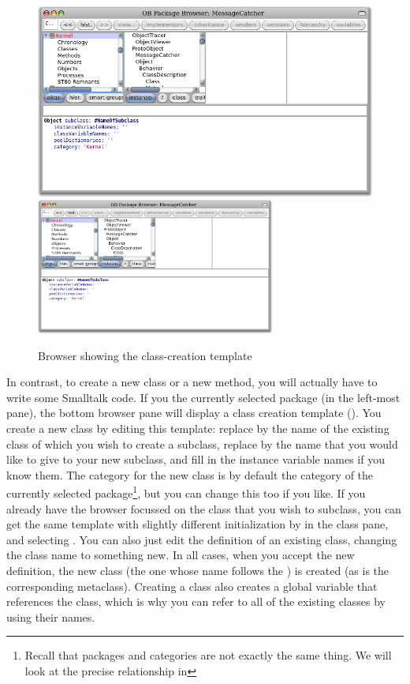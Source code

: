 \documentclass[a4paper,10pt,twoside]{book}
\begin{document}
\begin{figure}[htbp]
   \centering
   \ifluluelse
	   {\includegraphics[width=\textwidth]{SystemBrowserClassCreation}}
	   {\includegraphics[width=0.7\textwidth]{SystemBrowserClassCreation}}
   \caption{Browser showing the class-creation template
   }
\end{figure}

In contrast, to create a new class or a new method, you will actually
have to write some Smalltalk code.  If you \click the currently
selected package (in the left-most pane), the bottom
browser pane will display a class creation template
().  You create a new class by
editing this template: replace  by the name of the existing
class of which you wish to create a subclass, replace
 by the name that you would like to give to your
new subclass, and fill in the instance variable names if you know
them.  The category for the new class is by default the category of the currently
selected package\footnote{Recall that packages and categories are not exactly the same thing. We will look at the precise relationship in }, but you can change this too if you like.  If you
already have the browser focussed on the class that you wish to
subclass, you can get the same template with slightly different
initialization by  in the class pane, and
selecting .  You can also just
edit the definition of an existing class, changing the class name to
something new.  In all cases, when you accept the new definition, the
new class (the one whose name follows the \ct{#}) is created (as is
the corresponding metaclass).  Creating a class also creates a global
variable that references the class, which is why you can refer to all
of the existing classes by using their names.  
\end{document}
